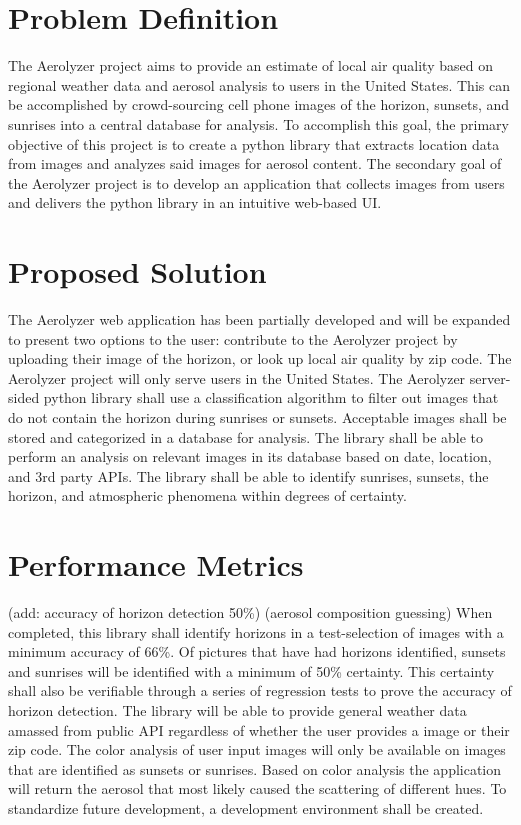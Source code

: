 \documentclass[letterpaper,10pt,draftclsnofoot,onecolumn]{IEEEtran}
\begin{document}
\clearpage
\begin{flushleft}
\section{Problem Definition}
The Aerolyzer project aims to provide an estimate of local air quality based on regional weather data and aerosol analysis to users in the United States. This can be accomplished by crowd-sourcing cell phone images of the horizon, sunsets, and sunrises into a central database for analysis. To accomplish this goal, the primary objective of this project is to create a python library that extracts location data from images and analyzes said images for aerosol content. The secondary goal of the Aerolyzer project is to develop an application that collects images from users and delivers the python library in an intuitive web-based UI. 

\section{Proposed Solution}
The Aerolyzer web application has been partially developed and will be expanded to present two options to the user: contribute to the Aerolyzer project by uploading their image of the horizon, or look up local air quality by zip code. The Aerolyzer project will only serve users in the United States. The Aerolyzer server-sided python library shall use a classification algorithm to filter out images that do not contain the horizon during sunrises or sunsets. Acceptable images shall be stored and categorized in a database for analysis. The library shall be able to perform an analysis on relevant images in its database based on date, location, and 3rd party APIs. The library shall be able to identify sunrises, sunsets, the horizon, and atmospheric phenomena within degrees of certainty.

\section{Performance Metrics} (add: accuracy of horizon detection 50\%) (aerosol composition guessing)
When completed, this library shall identify horizons in a test-selection of images with a minimum accuracy of 66\%. Of pictures that have had horizons identified, sunsets and sunrises will be identified with a minimum of 50\% certainty. This certainty shall also be verifiable through a series of regression tests to prove the accuracy of horizon detection. The library will be able to provide general weather data amassed from public API regardless of whether the user provides a image or their zip code. The color analysis of user input images will only be available on images that are identified as sunsets or sunrises. Based on color analysis the application will return the aerosol that most likely caused the scattering of different hues. To standardize future development, a development environment shall be created.


\end{flushleft}
\end{document}
